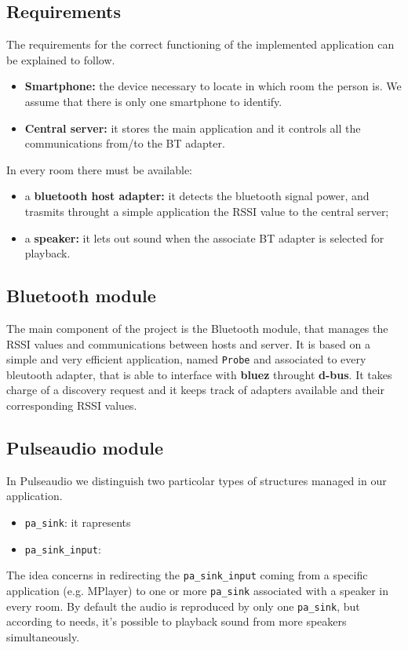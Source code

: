 \documentclass[conference]{./IEEEtran}
\begin{document}
\subsection{Requirements}
The requirements for the correct functioning of the implemented application can be explained to follow.
\begin{itemize}
\item{\textbf{Smartphone:}} the device necessary to locate in which room the person is. We assume that there is only one smartphone to identify.  
\item{\textbf{Central server:}} it stores the main application and it controls all the communications from/to the BT adapter.
\end{itemize}
In every room there must be available:
\begin{itemize}
\item{a \textbf{bluetooth host adapter:}} it detects the bluetooth signal power, and trasmits throught a simple application the RSSI value to the central server; 
\item{a \textbf{speaker:}} it lets out sound when the associate BT adapter is selected for playback.
\end{itemize}


\subsection{Bluetooth module}
The main component of the project is the Bluetooth module, that manages the RSSI values and communications between hosts and server. It is based on a simple and very efficient application, named \texttt{Probe} and associated to every bleutooth adapter, that is able to interface with \textbf{bluez} throught \textbf{d-bus}. It takes charge of a discovery request and it keeps track of adapters available and their corresponding RSSI values.     

\subsection{Pulseaudio module}
In Pulseaudio we distinguish two particolar types of structures managed in our application.
\begin{itemize}
\item \texttt{pa\_sink}: it rapresents
\item \texttt{pa\_sink\_input}:
\end{itemize}
The idea concerns in redirecting the \texttt{pa\_sink\_input} coming from a specific application (e.g. MPlayer) to one or more \texttt{pa\_sink} associated with a speaker in every room.
By default the audio is reproduced by only one \texttt{pa\_sink}, but according to needs, it's possible to playback sound from more speakers simultaneously.
\end{document}
